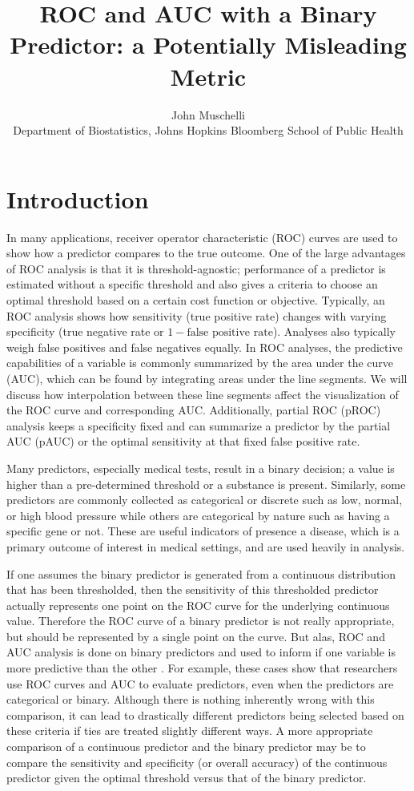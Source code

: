 \documentclass[article]{jss}
\author{
John Muschelli\\Department of Biostatistics, Johns Hopkins Bloomberg School of Public
Health
}
\title{ROC and AUC with a Binary Predictor: a Potentially Misleading Metric}
\begin{document}
\hypertarget{introduction}{%
\section{Introduction}\label{introduction}}

In many applications, receiver operator characteristic (ROC) curves are
used to show how a predictor compares to the true outcome. One of the
large advantages of ROC analysis is that it is threshold-agnostic;
performance of a predictor is estimated without a specific threshold and
also gives a criteria to choose an optimal threshold based on a certain
cost function or objective. Typically, an ROC analysis shows how
sensitivity (true positive rate) changes with varying specificity (true
negative rate or \(1 - \text{false positive rate}\)). Analyses also
typically weigh false positives and false negatives equally. In ROC
analyses, the predictive capabilities of a variable is commonly
summarized by the area under the curve (AUC), which can be found by
integrating areas under the line segments. We will discuss how
interpolation between these line segments affect the visualization of
the ROC curve and corresponding AUC. Additionally, partial ROC (pROC)
analysis keeps a specificity fixed and can summarize a predictor by the
partial AUC (pAUC) or the optimal sensitivity at that fixed false
positive rate.

Many predictors, especially medical tests, result in a binary decision;
a value is higher than a pre-determined threshold or a substance is
present. Similarly, some predictors are commonly collected as
categorical or discrete such as low, normal, or high blood pressure
while others are categorical by nature such as having a specific gene or
not. These are useful indicators of presence a disease, which is a
primary outcome of interest in medical settings, and are used heavily in
analysis.

If one assumes the binary predictor is generated from a continuous
distribution that has been thresholded, then the sensitivity of this
thresholded predictor actually represents one point on the ROC curve for
the underlying continuous value. Therefore the ROC curve of a binary
predictor is not really appropriate, but should be represented by a
single point on the curve. But alas, ROC and AUC analysis is done on
binary predictors and used to inform if one variable is more predictive
than the other
\citep{jama, jama2, glaveckaite2011value, blumberg2016technology, budwega2016factors, mwipatayi2016durability}.
For example, these cases show that researchers use ROC curves and AUC to
evaluate predictors, even when the predictors are categorical or binary.
Although there is nothing inherently wrong with this comparison, it can
lead to drastically different predictors being selected based on these
criteria if ties are treated slightly different ways. A more appropriate
comparison of a continuous predictor and the binary predictor may be to
compare the sensitivity and specificity (or overall accuracy) of the
continuous predictor given the optimal threshold versus that of the
binary predictor.
\end{document}
